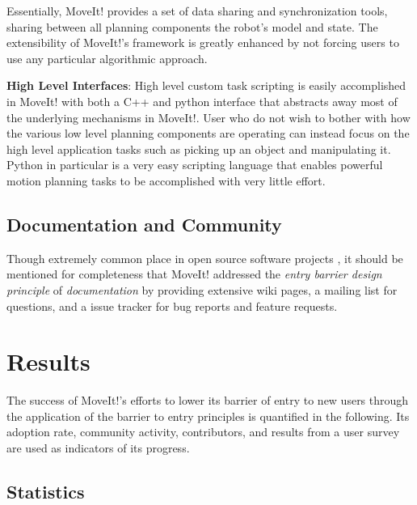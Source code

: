 \documentclass[10pt,journal,compsoc]{joser1}
\begin{document}
{Essentially, MoveIt! provides a set of data sharing and synchronization tools, sharing between all planning components the robot's model and state. The extensibility of MoveIt!'s framework is greatly enhanced by not forcing users to use any particular algorithmic approach. 

{\bf High Level Interfaces}: High level custom task scripting is easily accomplished in MoveIt! with both a C++ and python interface that abstracts away most of the underlying mechanisms in MoveIt!. User who do not wish to bother with how the various low level planning components are operating can instead focus on the high level application tasks such as picking up an object and manipulating it. Python in particular is a very easy scripting language that enables powerful motion planning tasks to be accomplished with very little effort.

\subsection{Documentation and Community}

Though extremely common place in open source software projects \cite{bruyninckx2001open}, it should be mentioned for completeness that MoveIt! addressed the \textit{entry barrier design principle} of \textit{documentation} by providing extensive wiki pages, a mailing list for questions, and a issue tracker for bug reports and feature requests.

\section{Results}
\label{sec::results}

The success of MoveIt!'s efforts to lower its barrier of entry to new users through the application of the barrier to entry principles is quantified in the following. Its adoption rate, community activity, contributors, and results from a user survey are used as indicators of its progress.

\subsection{Statistics}
\label{sec::statistics}

}
\end{document}
